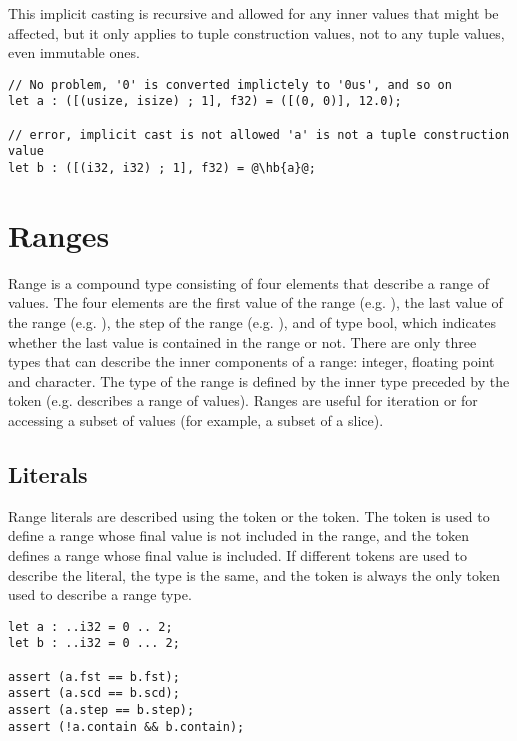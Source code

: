 This implicit casting is recursive and allowed for any inner values that might
be affected, but it only applies to tuple construction values, not to any tuple
values, even immutable ones.

\begin{lstlisting}[style=coloredverbatim, escapechar=@]
// No problem, '0' is converted implictely to '0us', and so on
let a : ([(usize, isize) ; 1], f32) = ([(0, 0)], 12.0);

// error, implicit cast is not allowed 'a' is not a tuple construction value
let b : ([(i32, i32) ; 1], f32) = @\hb{a}@;
\end{lstlisting}

\section {Ranges}%
\label{sec:range_type}

Range is a compound type consisting of four elements that describe a range of
values. The four elements are  the first value of the range (e.g.
),  the last value of the range (e.g. ),
 the step of the range (e.g. ), and  of
type bool, which indicates whether the last value  is contained in
the range or not. There are only three types that can describe the inner
components of a range: integer, floating point and character. The type of the
range is defined by the inner type preceded by the token  (e.g.
 describes a range of  values). Ranges are useful for
iteration or for accessing a subset of values (for example, a subset of a
slice).

\subsection {Literals}

Range literals are described using the  token or the 
token. The  token is used to define a range whose final value is not
included in the range, and the  token defines a range whose final
value is included. If different tokens are used to describe the literal, the
type is the same, and the  token is always the only token used to
describe a range type.

\begin{lstlisting}[style=coloredverbatim]
let a : ..i32 = 0 .. 2;
let b : ..i32 = 0 ... 2;

assert (a.fst == b.fst);
assert (a.scd == b.scd);
assert (a.step == b.step);
assert (!a.contain && b.contain);
\end{lstlisting}

